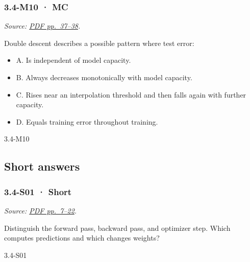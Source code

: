 \noindent\begin{minipage}{\linewidth}

\subsubsection{3.4-M10 · MC}\label{m10-mc-10}

\emph{Source:
\href{../Lecture\%20Slides/3.4.\%20Deep\%20Learning\%20Fundamentals\%20II.pdf\#page=37}{PDF
pp.~37--38}.}

Double descent describes a possible pattern where test error:

\begin{itemize}
\tightlist
\item
  A. Is independent of model capacity.
\item
  B. Always decreases monotonically with model capacity.
\item
  C. Rises near an interpolation threshold and then falls again with
  further capacity.
\item
  D. Equals training error throughout training.
\end{itemize}

\begin{solution}[8mm]{3.4-M10}

\end{solution}
\end{minipage}\par\medskip

\subsection{Short answers}\label{short-answers-10}

\noindent\begin{minipage}{\linewidth}

\subsubsection{3.4-S01 · Short}\label{s01-short-10}

\emph{Source:
\href{../Lecture\%20Slides/3.4.\%20Deep\%20Learning\%20Fundamentals\%20II.pdf\#page=7}{PDF
pp.~7--22}.}

Distinguish the forward pass, backward pass, and optimizer step. Which
computes predictions and which changes weights?

\begin{solution}[20mm]{3.4-S01}

\end{solution}
\end{minipage}\par\medskip

